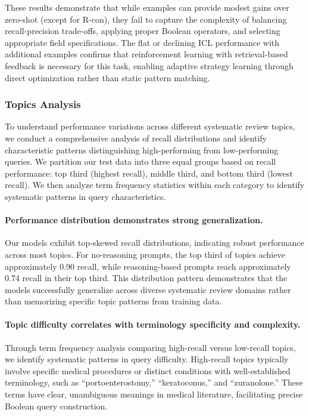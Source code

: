 These results demonstrate that while examples can provide modest gains over zero-shot (except for R-con), they fail to capture the complexity of balancing recall-precision trade-offs, applying proper Boolean operators, and selecting appropriate field specifications. The flat or declining ICL performance with additional examples confirms that reinforcement learning with retrieval-based feedback is necessary for this task, enabling adaptive strategy learning through direct optimization rather than static pattern matching.

\subsubsection{Topics Analysis}
To understand performance variations across different systematic review topics, we conduct a comprehensive analysis of recall distributions and identify characteristic patterns distinguishing high-performing from low-performing queries. We partition our test data into three equal groups based on recall performance: top third (highest recall), middle third, and bottom third (lowest recall). We then analyze term frequency statistics within each category to identify systematic patterns in query characteristics.

\paragraph{Performance distribution demonstrates strong generalization.} Our models exhibit top-skewed recall distributions, indicating robust performance across most topics. For no-reasoning prompts, the top third of topics achieve approximately 0.90 recall, while reasoning-based prompts reach approximately 0.74 recall in their top third. This distribution pattern demonstrates that the models successfully generalize across diverse systematic review domains rather than memorizing specific topic patterns from training data.

\paragraph{Topic difficulty correlates with terminology specificity and complexity.} Through term frequency analysis comparing high-recall versus low-recall topics, we identify systematic patterns in query difficulty. High-recall topics typically involve specific medical procedures or distinct conditions with well-established terminology, such as ``portoenterostomy,'' ``keratoconus,'' and ``zuranolone.'' These terms have clear, unambiguous meanings in medical literature, facilitating precise Boolean query construction.

